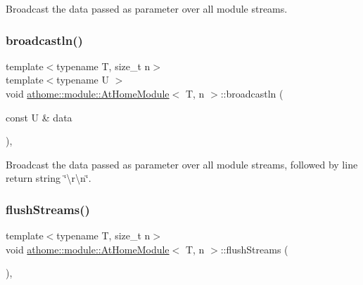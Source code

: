 Broadcast the data passed as parameter over all module streams. \mbox{\label{classathome_1_1module_1_1_at_home_module_a863a9efaa6d10169d1888278cbc70175}} 
\subsubsection{\texorpdfstring{broadcastln()}{broadcastln()}}
{\footnotesize\ttfamily template$<$typename T, size\+\_\+t n$>$ \\
template$<$typename U $>$ \\
void \mbox{\hyperlink{classathome_1_1module_1_1_at_home_module}{athome\+::module\+::\+At\+Home\+Module}}$<$ T, n $>$\+::broadcastln (\begin{DoxyParamCaption}\item[{const U \&}]{data }\end{DoxyParamCaption})\hspace{0.3cm}{\ttfamily [inline]}, {\ttfamily [protected]}}

Broadcast the data passed as parameter over all module streams, followed by line return string \char`\"{}\textbackslash{}r\textbackslash{}n\char`\"{}. \mbox{\label{classathome_1_1module_1_1_at_home_module_ad6e64ed8ff0c2daf0e8bb935b0a8e127}} 
\subsubsection{\texorpdfstring{flush\+Streams()}{flushStreams()}}
{\footnotesize\ttfamily template$<$typename T, size\+\_\+t n$>$ \\
void \mbox{\hyperlink{classathome_1_1module_1_1_at_home_module}{athome\+::module\+::\+At\+Home\+Module}}$<$ T, n $>$\+::flush\+Streams (\begin{DoxyParamCaption}{ }\end{DoxyParamCaption})\hspace{0.3cm}{\ttfamily [inline]}, {\ttfamily [protected]}}

